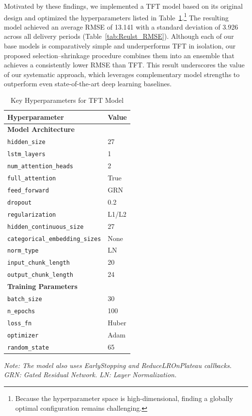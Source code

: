 \documentclass{article}
\begin{document}
Motivated by these findings, we implemented a TFT model based on its original design and optimized the hyperparameters listed in Table~\ref{tab:tft_params}.\footnote{Because the hyperparameter space is high-dimensional, finding a globally optimal configuration remains challenging.} The resulting model achieved an average RMSE of 13.141 with a standard deviation of 3.926 across all delivery periods (Table~\ref{tab:Reulst_RMSE}). Although each of our base models is comparatively simple and underperforms TFT in isolation, our proposed selection--shrinkage procedure combines them into an ensemble that achieves a consistently lower RMSE than TFT. This result underscores the value of our systematic approach, which leverages complementary model strengths to outperform even state-of-the-art deep learning baselines.


\begin{table}[H]
    \centering
    \caption{Key Hyperparameters for TFT Model}
    \label{tab:tft_params}
    \footnotesize
    \begin{tabular}{@{}ll@{}}
        \toprule
        \textbf{Hyperparameter} & \textbf{Value} \\ \midrule
        \multicolumn{2}{l}{\textbf{Model Architecture}} \\
        \texttt{hidden\_size} & 27 \\
        \texttt{lstm\_layers} & 1 \\
        \texttt{num\_attention\_heads} & 2 \\
        \texttt{full\_attention} & True \\
        \texttt{feed\_forward} & GRN \\
        \texttt{dropout} & 0.2 \\
        \texttt{regularization} & L1/L2\\
        \texttt{hidden\_continuous\_size} & 27 \\
        \texttt{categorical\_embedding\_sizes} & None \\
        \texttt{norm\_type} & LN \\
        \texttt{input\_chunk\_length} & 20 \\
        \texttt{output\_chunk\_length} & 24 \\
        \multicolumn{2}{l}{\textbf{Training Parameters}} \\
        \texttt{batch\_size} & 30 \\
        \texttt{n\_epochs} & 100 \\
        \texttt{loss\_fn} & Huber \\
        \texttt{optimizer} & Adam \\
        \texttt{random\_state} & 65 \\
        \bottomrule
    \end{tabular}

    \vspace{1mm}
    \footnotesize
    \textit{Note: The model also uses EarlyStopping and ReduceLROnPlateau callbacks. GRN: Gated Residual Network. LN: Layer Normalization.}
\end{table}
\end{document}
